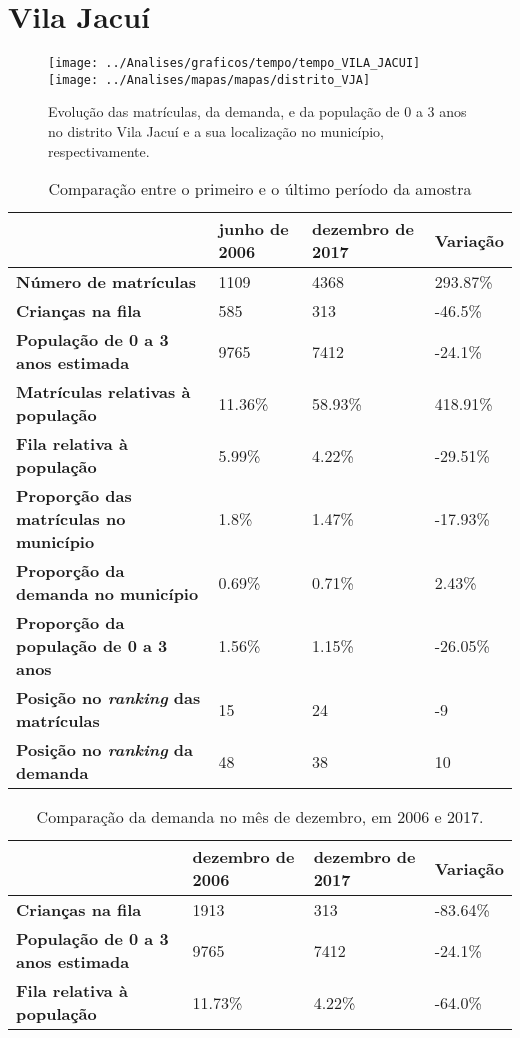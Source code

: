 \section{Vila Jacuí}
\begin{figure}[H]
	\centering
	\texttt{[image: ../Analises/graficos/tempo/tempo\_VILA\_JACUI]}
	\texttt{[image: ../Analises/mapas/mapas/distrito\_VJA]}
	\caption{Evolução das matrículas, da demanda, e da população de 0 a 3 anos no distrito Vila Jacuí e a sua localização no município, respectivamente.}
\end{figure}
\begin{table}[H]
	\begin{tabular}{|l|l|l|l|}
		\hline
		\textbf{}                                      & \textbf{junho de 2006}       & \textbf{dezembro de 2017}    & \textbf{Variação} \\ \hline
		\textbf{Número de matrículas}                  & 1109 & 4368 & 293.87\% \\ \hline
		\textbf{Crianças na fila}                      & 585 & 313 & -46.5\% \\ \hline
		\textbf{População de 0 a 3 anos estimada}      & 9765 & 7412 & -24.1\% \\ \hline
		\textbf{Matrículas relativas à população}      & 11.36\% & 58.93\% & 418.91\% \\ \hline
		\textbf{Fila relativa à população}             & 5.99\% & 4.22\% & -29.51\% \\ \hline
		\textbf{Proporção das matrículas no município} & 1.8\% & 1.47\% & -17.93\% \\ \hline
		\textbf{Proporção da demanda no município}     & 0.69\% & 0.71\% & 2.43\% \\ \hline
		\textbf{Proporção da população de 0 a 3 anos}  & 1.56\% & 1.15\% & -26.05\% \\ \hline
		\textbf{Posição no \textit{ranking} das matrículas}     & 15 & 24 & -9 \\ \hline
		\textbf{Posição no \textit{ranking} da demanda}         & 48 & 38 & 10 \\ \hline
	\end{tabular}
	\caption{Comparação entre o primeiro e o último período da amostra}
\end{table}
\begin{table}[H]
	\begin{tabular}{|l|l|l|l|}
		\hline
		\textbf{}                                 & \textbf{dezembro de 2006} & \textbf{dezembro de 2017} & \textbf{Variação} \\ \hline
		\textbf{Crianças na fila}                      & 1913 & 313 & -83.64\% \\ \hline
		\textbf{População de 0 a 3 anos estimada}      & 9765 & 7412 & -24.1\% \\ \hline
		\textbf{Fila relativa à população}             & 11.73\% & 4.22\% & -64.0\% \\ \hline
	\end{tabular}
	\caption{Comparação da demanda no mês de dezembro, em 2006 e 2017.}
\end{table}
